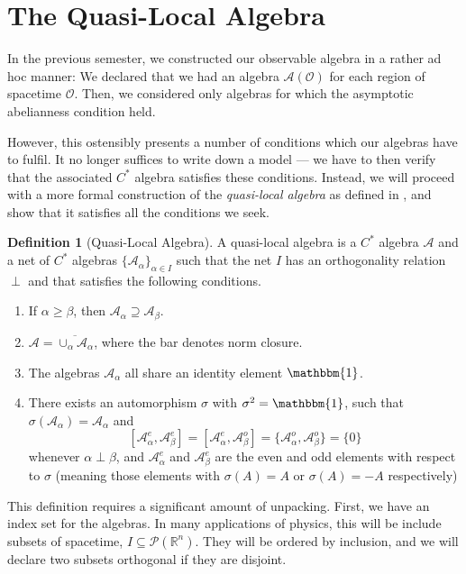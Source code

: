 \documentclass[prb,11pt, nofootinbib]{revtex4-2}
\theoremstyle{definition}
\theoremstyle{definition}
\theoremstyle{definition}
\theoremstyle{definition}
\newtheorem{Definition}[Theorem]{Definition}
\newcommand{\R}{\mathbb{R}}
\begin{document}
\section{The Quasi-Local Algebra}
In the previous semester, we constructed our observable algebra in a rather ad hoc manner: We declared that we had an algebra $\mathcal{A}(\mathcal{O})$ for each region of spacetime $\mathcal{O}$. Then, we considered only algebras for which the asymptotic abelianness condition held.

However, this ostensibly presents a number of conditions which our algebras have to fulfil. It no longer suffices to write down a model --- we have to then verify that the associated $C^*$ algebra satisfies these conditions. Instead, we will proceed with a more formal construction of the \emph{quasi-local algebra} as defined in \cite{bratteli2012operator}, and show that it satisfies all the conditions we seek.
\begin{Definition}[Quasi-Local Algebra]
	A quasi-local algebra is a $C^*$ algebra $\mathcal{A}$ and a net of $C^*$ algebras $\{\mathcal{A}_\alpha\}_{\alpha\in I}$ such that the net $I$ has an orthogonality relation $\perp$ and that satisfies the following conditions.
	\begin{enumerate}
		\item If $\alpha\ge \beta$, then $\mathcal{A}_\alpha \supseteq \mathcal{A}_\beta$.
		\item $\mathcal{A}=\overline{\cup_\alpha \mathcal{A}_\alpha}$, where the bar denotes norm closure.
		\item The algebras $\mathcal{A}_\alpha$ all share an identity element $\mathbbm{1}$.
		\item There exists an automorphism $\sigma$ with $\sigma^2=\mathbbm{1}$, such that $\sigma(\mathcal{A}_\alpha)=\mathcal{A}_\alpha$ and
			\[
				[\mathcal{A}_\alpha^e, \mathcal{A}_\beta^e]=[\mathcal{A}_\alpha^e, \mathcal{A}_\beta^o] = \{\mathcal{A}_\alpha^o, \mathcal{A}_\beta^o \} = \{0\}
			\] 
			whenever $\alpha\perp \beta$, and $ \mathcal{A}_\alpha^e$ and $\mathcal{A}_\beta^e$ are the even and odd elements with respect to $\sigma$ (meaning those elements with $\sigma(A)=A$ or $\sigma(A) = -A$ respectively)
	\end{enumerate}
\end{Definition}
This definition requires a significant amount of unpacking. First, we have an index set for the algebras. In many applications of physics, this will be include subsets of spacetime, $I\subseteq \mathcal{P}(\R^n)$. They will be ordered by inclusion, and we will declare two subsets orthogonal if they are disjoint.
\end{document}
